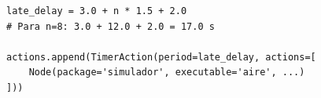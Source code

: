\begin{figure}[t]
\centering
\begin{lstlisting}[style=python,
    caption={Retardo para nodos que dependen de todos los robots.},
    label={lst:late_delay}]
late_delay = 3.0 + n * 1.5 + 2.0
# Para n=8: 3.0 + 12.0 + 2.0 = 17.0 s

actions.append(TimerAction(period=late_delay, actions=[
    Node(package='simulador', executable='aire', ...)
]))
\end{lstlisting}
\end{figure}
